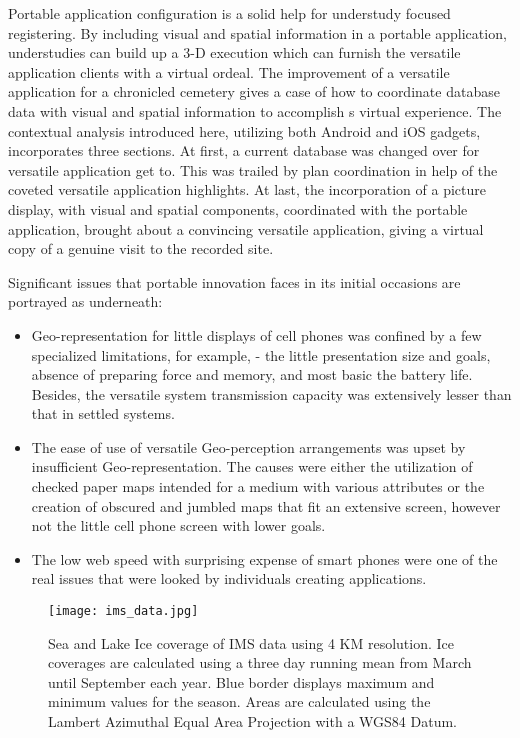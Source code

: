 Portable application configuration is a solid help for understudy focused registering. By including visual and spatial information in a portable application, understudies can build up a 3-D execution which can furnish the versatile application clients with a virtual ordeal. The improvement of a versatile application for a chronicled cemetery gives a case of how to coordinate database data with visual and spatial information to accomplish s virtual experience. The contextual analysis introduced here, utilizing both Android and \gls{iOS} gadgets, incorporates three sections. At first, a current database was changed over for versatile application get to. This was trailed by plan coordination in help of the coveted versatile application highlights. At last, the incorporation of a picture display, with visual and spatial components, coordinated with the portable application, brought about a convincing versatile application, giving a virtual copy of a genuine visit to the recorded site.

Significant issues that portable innovation faces in its initial occasions are portrayed as underneath:

\begin{itemize}
  \item Geo-representation for little displays of cell phones was confined by a few specialized limitations, for example, - the little presentation size and goals, absence of preparing force and memory, and most basic the battery life. Besides, the versatile system transmission capacity was extensively lesser than that in settled systems.
  
  \item The ease of use of versatile Geo-perception arrangements was upset by insufficient Geo-representation. The causes were either the utilization of checked paper maps intended for a medium with various attributes or the creation of obscured and jumbled maps that fit an extensive screen, however not the little cell phone screen with lower goals.
  
  \item The low web speed with surprising expense of smart phones were one of the real issues that were looked by individuals creating applications.
\end{itemize}


%
\begin{figure}[ht]
  \centering
  \begin{minipage}{4.5in}
    \texttt{[image: ims\_data.jpg]}
    \caption{ \label{fig:nat_ice} Sea and Lake Ice coverage of IMS data using 4 KM resolution. Ice coverages are calculated using a three day running mean from March until September each year. Blue border displays maximum and minimum values for the season. Areas are calculated using the Lambert Azimuthal Equal Area Projection with a WGS84 Datum. \cite{nat_ice}}
  \end{minipage}
\end{figure}
%

